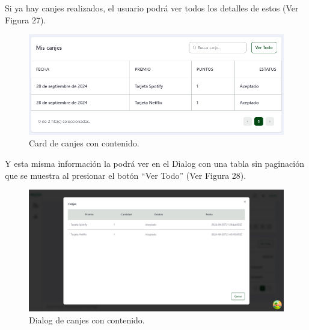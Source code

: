 Si ya hay canjes realizados, el usuario podrá ver todos los detalles de estos (Ver Figura 27).

    \begin{figure}[H]
        \begin{center}
            \includegraphics[scale=0.50]{img/actividades/detalles-campanias/card-canjes-contenido.png}
            \caption{Card de canjes con contenido.}
            \label{fig:card-canjes-contenido}
        \end{center}
    \end{figure}

Y esta misma información la podrá ver en el Dialog con una tabla sin paginación que se muestra al presionar el botón ``Ver Todo'' (Ver Figura 28).

\begin{figure}[H]
    \begin{center}
        \includegraphics[scale=0.32]{img/actividades/detalles-campanias/dialog-canjes-contenido.png}
        \caption{Dialog de canjes con contenido.}
        \label{fig:dialog-canjes-contenido}
    \end{center}
\end{figure}